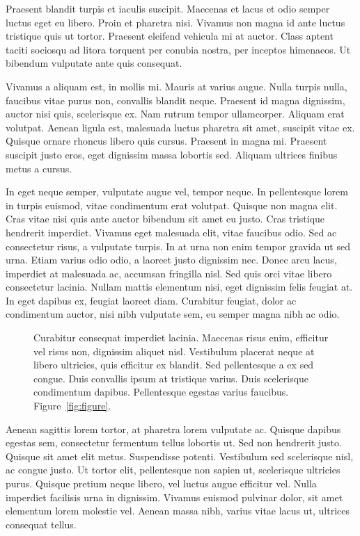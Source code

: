 \documentclass[]{aastex62}
\begin{document}
Praesent blandit turpis et iaculis suscipit. Maecenas et lacus et odio semper luctus eget eu libero. Proin et pharetra nisi. Vivamus non magna id ante luctus tristique quis ut tortor. Praesent eleifend vehicula mi at auctor. Class aptent taciti sociosqu ad litora torquent per conubia nostra, per inceptos himenaeos. Ut bibendum vulputate ante quis consequat.

Vivamus a aliquam est, in mollis mi. Mauris at varius augue. Nulla turpis nulla, faucibus vitae purus non, convallis blandit neque. Praesent id magna dignissim, auctor nisi quis, scelerisque ex. Nam rutrum tempor ullamcorper. Aliquam erat volutpat. Aenean ligula est, malesuada luctus pharetra sit amet, suscipit vitae ex. Quisque ornare rhoncus libero quis cursus. Praesent in magna mi. Praesent suscipit justo eros, eget dignissim massa lobortis sed. Aliquam ultrices finibus metus a cursus.

In eget neque semper, vulputate augue vel, tempor neque. In pellentesque lorem in turpis euismod, vitae condimentum erat volutpat. Quisque non magna elit. Cras vitae nisi quis ante auctor bibendum sit amet eu justo. Cras tristique hendrerit imperdiet. Vivamus eget malesuada elit, vitae faucibus odio. Sed ac consectetur risus, a vulputate turpis. In at urna non enim tempor gravida ut sed urna. Etiam varius odio odio, a laoreet justo dignissim nec. Donec arcu lacus, imperdiet at malesuada ac, accumsan fringilla nisl. Sed quis orci vitae libero consectetur lacinia. Nullam mattis elementum nisi, eget dignissim felis feugiat at. In eget dapibus ex, feugiat laoreet diam. Curabitur feugiat, dolor ac condimentum auctor, nisi nibh vulputate sem, eu semper magna nibh ac odio.

\begin{figure}[ht!]
\caption{Curabitur consequat imperdiet lacinia. Maecenas risus enim, efficitur vel risus non, dignissim aliquet nisl. Vestibulum placerat neque at libero ultricies, quis efficitur ex blandit. Sed pellentesque a ex sed congue. Duis convallis ipsum at tristique varius. Duis scelerisque condimentum dapibus. Pellentesque egestas varius faucibus. Figure~\ref{fig:figure}.}
\label{fig:figure2}
\end{figure}

Aenean sagittis lorem tortor, at pharetra lorem vulputate ac. Quisque dapibus egestas sem, consectetur fermentum tellus lobortis ut. Sed non hendrerit justo. Quisque sit amet elit metus. Suspendisse potenti. Vestibulum sed scelerisque nisl, ac congue justo. Ut tortor elit, pellentesque non sapien ut, scelerisque ultricies purus. Quisque pretium neque libero, vel luctus augue efficitur vel. Nulla imperdiet facilisis urna in dignissim. Vivamus euismod pulvinar dolor, sit amet elementum lorem molestie vel. Aenean massa nibh, varius vitae lacus ut, ultrices consequat tellus.
\end{document}
